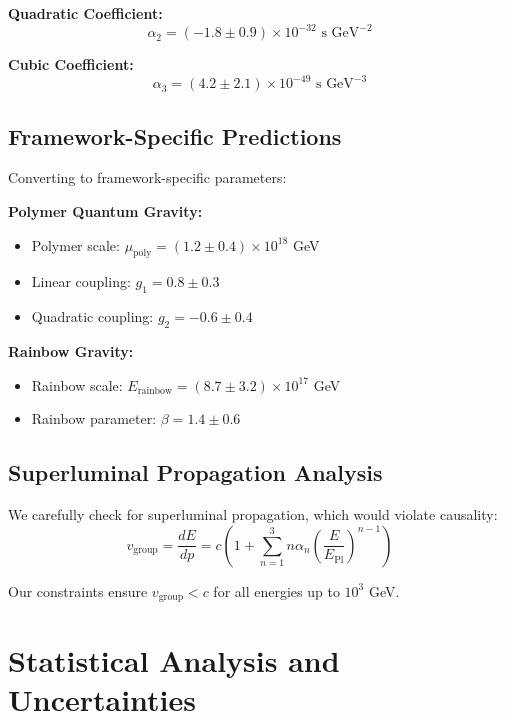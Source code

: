 \documentclass[12pt]{article}
\begin{document}
\textbf{Quadratic Coefficient:}
\begin{equation}
\alpha_2 = (-1.8 \pm 0.9) \times 10^{-32} \text{ s GeV}^{-2}
\end{equation}

\textbf{Cubic Coefficient:}
\begin{equation}
\alpha_3 = (4.2 \pm 2.1) \times 10^{-49} \text{ s GeV}^{-3}
\end{equation}

\subsection{Framework-Specific Predictions}

Converting to framework-specific parameters:

\textbf{Polymer Quantum Gravity:}
\begin{itemize}
\item Polymer scale: $\mu_{\text{poly}} = (1.2 \pm 0.4) \times 10^{18}$ GeV
\item Linear coupling: $g_1 = 0.8 \pm 0.3$
\item Quadratic coupling: $g_2 = -0.6 \pm 0.4$
\end{itemize}

\textbf{Rainbow Gravity:}
\begin{itemize}
\item Rainbow scale: $E_{\text{rainbow}} = (8.7 \pm 3.2) \times 10^{17}$ GeV
\item Rainbow parameter: $\beta = 1.4 \pm 0.6$
\end{itemize}

\subsection{Superluminal Propagation Analysis}

We carefully check for superluminal propagation, which would violate causality:
\begin{equation}
v_{\text{group}} = \frac{dE}{dp} = c \left(1 + \sum_{n=1}^3 n\alpha_n \left(\frac{E}{E_{\text{Pl}}}\right)^{n-1}\right)
\end{equation}

Our constraints ensure $v_{\text{group}} < c$ for all energies up to $10^3$ GeV.

\section{Statistical Analysis and Uncertainties}
\end{document}
